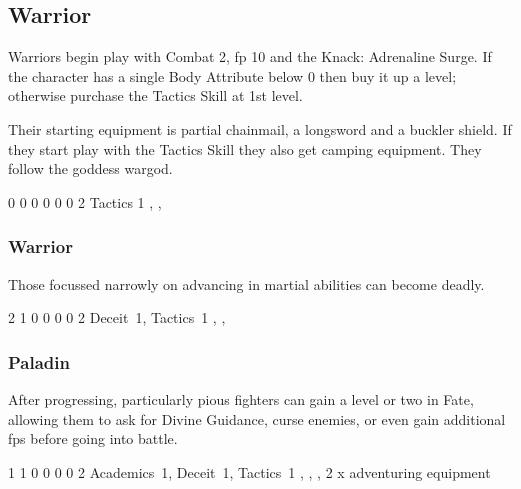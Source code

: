 {\begin{multicols}{2}
\subsection{Warrior}

Warriors begin play with Combat 2, \gls{fp} 10 and the Knack: Adrenaline Surge.
If the character has a single Body Attribute below 0 then buy it up a level; otherwise purchase the Tactics Skill at 1st level.

Their starting equipment is partial chainmail, a longsword and a buckler shield.
If they start play with the Tactics Skill they also get camping equipment.
They follow the goddess \gls{wargod}.


{0}%
{0}%
{{0}%
{0}%
{0}}%
{0}%
{2}%
{Tactics 1\knacks{\adrenalinesurge}}%
{\longsword, \partialleather, \bucklar}%
{\addtocounter{fp}{5}}

\subsubsection{Warrior}

Those focussed narrowly on advancing in martial abilities can become deadly.


{2}%
{1}%
{{0}%
{0}%
{0}}%
{0}%
{2}%
{Deceit~1, Tactics~1\knacks{\adrenalinesurge, \charge, \firststrike}}%
{\longsword, \partialchain, \bucklar}%
{\addtocounter{fp}{5}}

\subsubsection{Paladin}

After progressing, particularly pious fighters can gain a level or two in Fate, allowing them to ask for Divine Guidance, curse enemies, or even gain additional \glspl{fp} before going into battle.


{1}%
{1}%
{{0}%
{0}%
{0}}%
{0}%
{2}%
{Academics~1, Deceit~1, Tactics~1\knacks{\adrenalinesurge, \finishingblow}}%
{\longsword, \partialchain, \bucklar, 2 x adventuring equipment}%
{\addtocounter{fp}{10}}


\end{multicols}}
